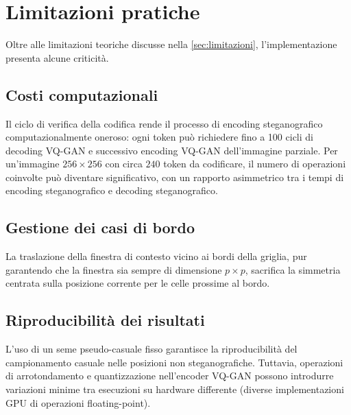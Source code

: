 \section{Limitazioni pratiche}
\label{sec:limitazioni-pratiche}

Oltre alle limitazioni teoriche discusse nella \autoref{sec:limitazioni}, l'implementazione presenta alcune criticità.

\subsection{Costi computazionali}

Il ciclo di verifica della codifica rende il processo di encoding steganografico computazionalmente oneroso: ogni token può richiedere fino a 100 cicli di decoding VQ-GAN e successivo encoding VQ-GAN dell'immagine parziale. Per un'immagine $256 \times 256$ con circa $240$ token da codificare, il numero di operazioni coinvolte può diventare significativo, con un rapporto asimmetrico tra i tempi di encoding steganografico e decoding steganografico.

\subsection{Gestione dei casi di bordo}

La traslazione della finestra di contesto vicino ai bordi della griglia, pur garantendo che la finestra sia sempre di dimensione $p \times p$, sacrifica la simmetria centrata sulla posizione corrente per le celle prossime al bordo.

\subsection{Riproducibilità dei risultati}

L'uso di un seme pseudo-casuale fisso garantisce la riproducibilità del campionamento casuale nelle posizioni non steganografiche. Tuttavia, operazioni di arrotondamento e quantizzazione nell'encoder VQ-GAN possono introdurre variazioni minime tra esecuzioni su hardware differente (diverse implementazioni GPU di operazioni floating-point).